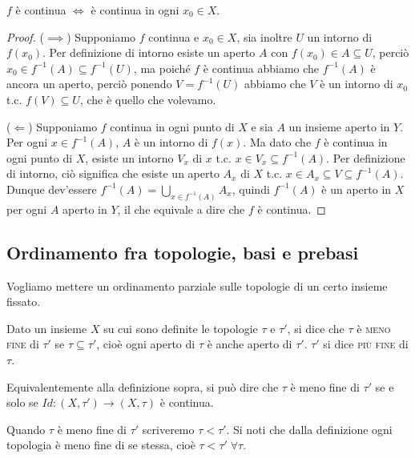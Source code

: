 \documentclass{article}
\begin{document}
\begin{thm}
	$f$ è continua $\Leftrightarrow$ è continua in ogni $x_0 \in X$.
\end{thm}

\begin{proof}
	($\implies$) Supponiamo $f$ continua e $x_0 \in X$, sia inoltre $U$ un intorno di $f(x_0)$. Per definizione di intorno esiste un aperto $A$ con $f(x_0) \in A \subseteq U$, perciò $x_0 \in f^{-1}(A) \subseteq f^{-1}(U)$, ma poiché $f$ è continua abbiamo che $f^{-1}(A)$ è ancora un aperto, perciò ponendo $V=f^{-1}(U)$ abbiamo che $V$ è un intorno di $x_0$ t.c. $f(V) \subseteq U$, che è quello che volevamo.

	($\Leftarrow$) Supponiamo $f$ continua in ogni punto di $X$ e sia $A$ un insieme aperto in $Y$. Per ogni $x \in f^{-1}(A)$, $A$ è un intorno di $f(x)$. Ma dato che $f$ è continua in ogni punto di $X$, esiste un intorno $V_x$ di $x$ t.c. $x \in V_x \subseteq f^{-1}(A)$. Per definizione di intorno, ciò significa che esiste un aperto $A_x$ di $X$ t.c. $x \in A_x \subseteq V \subseteq f^{-1}(A)$. Dunque dev'essere $\displaystyle f^{-1}(A)= \bigcup_{x \in f^{-1}(A)} A_x$,
	quindi $f^{-1}(A)$ è un aperto in $X$ per ogni $A$ aperto in $Y$, il che equivale a dire che $f$ è continua.
\end{proof}

\subsection{Ordinamento fra topologie, basi e prebasi}

Vogliamo mettere un ordinamento parziale sulle topologie di un certo insieme
fissato.

\begin{defn}
Dato un insieme $X$ su cui sono definite le topologie $\tau$ e $\tau'$, si dice
che $\tau$ \`e \textsc{meno fine} di $\tau'$ se $\tau \subseteq \tau'$, cioè
ogni aperto di $\tau$ è anche aperto di $\tau'$. $\tau'$ si dice \textsc{più
fine} di $\tau$.
\end{defn}

\begin{oss}
Equivalentemente alla definizione sopra, si pu\`o dire che $\tau$ \`e meno fine
di $\tau'$ se e solo se ${Id:(X,\tau')\rightarrow(X, \tau)}$ \`e continua.
\end{oss}

Quando $\tau$ è meno fine di $\tau'$ scriveremo $\tau < \tau'$. Si noti che
dalla definizione ogni topologia è meno fine di se stessa, cioè $\tau < \tau'
\; \forall \tau$.
\end{document}
